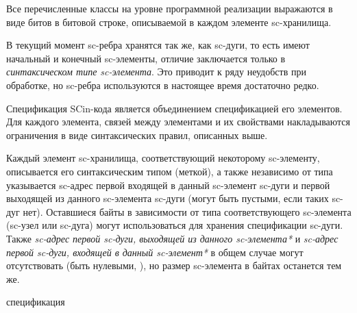 Все перечисленные классы на уровне программной реализации выражаются в виде битов в битовой строке, описываемой в каждом элементе sc-хранилища.

В текущий момент sc-ребра хранятся так же, как sc-дуги, то есть имеют начальный и конечный sc-элементы, отличие заключается только в \textit{синтаксическом типе sc-элемента}. Это приводит к ряду неудобств при обработке, но sc-ребра используются в настоящее время достаточно редко.

Спецификация SCin-кода является объединением спецификацией его элементов. Для каждого элемента, связей между элементами и их свойствами накладываются ограничения в виде синтаксических правил, описанных выше.

\begin{SCn}
\begin{scnindent}
\end{scnindent}
\end{SCn}

Каждый элемент sc-хранилища, соответствующий некоторому sc-элементу, описывается его синтаксическим типом (меткой), а также независимо от типа указывается sc-адрес первой входящей в данный sc-элемент sc-дуги и первой выходящей из данного sc-элемента sc-дуги (могут быть пустыми, если таких sc-дуг нет). Оставшиеся байты в зависимости от типа соответствующего sc-элемента (sc-узел или sc-дуга) могут использоваться для хранения спецификации sc-дуги. Также \textit{sc-адрес первой sc-дуги, выходящей из данного sc-элемента*} и \textit{sc-адрес первой sc-дуги, входящей в данный sc-элемент*} в общем случае могут отсутствовать (быть нулевыми, ), но размер sc-элемента в байтах останется тем же.

\begin{SCn}
\begin{scnrelfromset}{спецификация}
\end{scnrelfromset}
\end{SCn}

